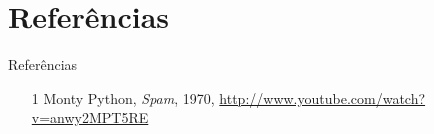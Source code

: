 \documentclass[dvipdfm]{beamer}
\begin{document}
\section{Referências}
\begin{frame}{Referências}
	\begin{itemize}
		\item [1] Monty Python, \emph{Spam}, 1970, \url{http://www.youtube.com/watch?v=anwy2MPT5RE} 
	\end{itemize}
\end{frame}
\end{document}
